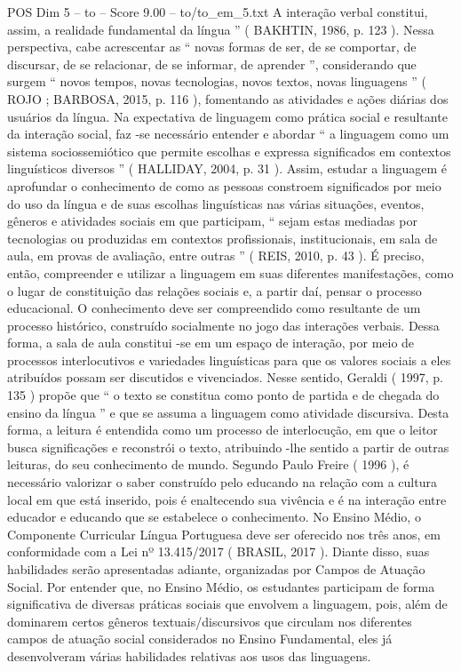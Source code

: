\begin{textsample}{POS Dim 5 – to – Score 9.00 – to/to\_em\_5.txt}
A interação verbal constitui, assim, a realidade fundamental da língua ” ( BAKHTIN, 1986, p. 123 ).
Nessa perspectiva, cabe acrescentar as “ novas formas de ser, de se comportar, de discursar, de se relacionar, de se informar, de aprender ”, considerando que surgem “ novos tempos, novas tecnologias, novos textos, novas linguagens ” ( ROJO ; BARBOSA, 2015, p. 116 ), fomentando as atividades e ações diárias dos usuários da língua.
Na expectativa de linguagem como prática social e resultante da interação social, faz -se necessário entender e abordar “ a linguagem como um sistema sociossemiótico que permite escolhas e expressa significados em contextos linguísticos diversos ” ( HALLIDAY, 2004, p. 31 ).
Assim, estudar a linguagem é aprofundar o conhecimento de como as pessoas constroem significados por meio do uso da língua e de suas escolhas linguísticas nas várias situações, eventos, gêneros e atividades sociais em que participam, “ sejam estas mediadas por tecnologias ou produzidas em contextos profissionais, institucionais, em sala de aula, em provas de avaliação, entre outras ” ( REIS, 2010, p. 43 ).
É preciso, então, compreender e utilizar a linguagem em suas diferentes manifestações, como o lugar de constituição das relações sociais e, a partir daí, pensar o processo educacional.
O conhecimento deve ser compreendido como resultante de um processo histórico, construído socialmente no jogo das interações verbais.
Dessa forma, a sala de aula constitui -se em um espaço de interação, por meio de processos interlocutivos e variedades linguísticas para que os valores sociais a eles atribuídos possam ser discutidos e vivenciados.
Nesse sentido, Geraldi ( 1997, p. 135 ) propõe que “ o texto se constitua como ponto de partida e de chegada do ensino da língua ” e que se assuma a linguagem como atividade discursiva.
Desta forma, a leitura é entendida como um processo de interlocução, em que o leitor busca significações e reconstrói o texto, atribuindo -lhe sentido a partir de outras leituras, do seu conhecimento de mundo.
Segundo Paulo Freire ( 1996 ), é necessário valorizar o saber construído pelo educando na relação com a cultura local em que está inserido, pois é enaltecendo sua vivência e é na interação entre educador e educando que se estabelece o conhecimento.
No Ensino Médio, o Componente Curricular Língua Portuguesa deve ser oferecido nos três anos, em conformidade com a Lei nº 13.415/2017 ( BRASIL, 2017 ).
Diante disso, suas habilidades serão apresentadas adiante, organizadas por Campos de Atuação Social.
Por entender que, no Ensino Médio, os estudantes participam de forma significativa de diversas práticas sociais que envolvem a linguagem, pois, além de dominarem certos gêneros textuais/discursivos que circulam nos diferentes campos de atuação social considerados no Ensino Fundamental, eles já desenvolveram várias habilidades relativas aos usos das linguagens.

\end{textsample}

